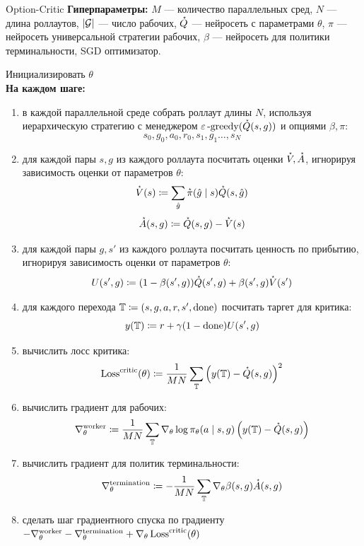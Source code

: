 \begin{algorithm}{Option-Critic}
\textbf{Гиперпараметры:} $M$ --- количество параллельных сред, $N$ --- длина роллаутов, $|\mathcal{G}|$ --- число рабочих, $\accentset{\star}{Q}$ --- нейросеть с параметрами $\theta$, $\pi$ --- нейросеть универсальной стратегии рабочих, $\beta$ --- нейросеть для политики терминальности, SGD оптимизатор.

\vspace{0.3cm}
Инициализировать $\theta$ \\
\textbf{На каждом шаге:}
\begin{enumerate}
    \item в каждой параллельной среде собрать роллаут длины $N$, используя иерархическую стратегию с менеджером $\varepsilon\operatorname{-greedy}(\accentset{\star}{Q}(s, g))$ и опциями $\beta, \pi$:
    $$s_0, g_0, a_0, r_0, s_1, g_1 \dots , s_N$$
    \item для каждой пары $s, g$ из каждого роллаута посчитать оценки $\accentset{\star}{V}, \accentset{\star}{A}$, игнорируя зависимость оценки от параметров $\theta$:
    $$\accentset{\star}{V}(s) \coloneqq \sum_{\hat{g}} \accentset{\star}{\pi}(\hat{g} \mid s) \accentset{\star}{Q}(s, \hat{g})$$
    $$\accentset{\star}{A}(s, g) \coloneqq \accentset{\star}{Q}(s, g) - \accentset{\star}{V}(s)$$
    \item для каждой пары $g, s'$ из каждого роллаута посчитать ценность по прибытию, игнорируя зависимость оценки от параметров $\theta$:
    $$U(s', g) \coloneqq (1 - \beta(s', g)) \accentset{\star}{Q}(s', g) + \beta(s', g) \accentset{\star}{V}(s')$$
    \item для каждого перехода $\mathbb{T} \coloneqq (s, g, a, r, s', \mathrm{done})$ посчитать таргет для критика:
    $$y(\mathbb{T}) \coloneqq r + \gamma (1 - \mathrm{done}) U(s', g)$$
    \item вычислить лосс критика:
    $$\operatorname{Loss}^{\mathrm{critic}}(\theta) \coloneqq \frac{1}{MN}\sum_{\mathbb{T}} \left( y(\mathbb{T}) - \accentset{\star}{Q}(s, g) \right) ^2$$
    \item вычислить градиент для рабочих:
    $$\nabla^{\mathrm{worker}}_\theta \coloneqq \frac{1}{MN}\sum_{\mathbb{T}} \nabla_\theta \log \pi_\theta(a \mid s, g) \left( y(\mathbb{T}) - \accentset{\star}{Q}(s, g) \right) $$
    \item вычислить градиент для политик терминальности:
    $$\nabla^{\mathrm{termination}}_\theta \coloneqq -\frac{1}{MN}\sum_{\mathbb{T}} \nabla_\theta \beta(s, g) \accentset{\star}{A}(s, g) $$
    \item сделать шаг градиентного спуска по градиенту $-\nabla^{\mathrm{worker}}_\theta - \nabla^{\mathrm{termination}}_\theta + \nabla_\theta \operatorname{Loss}^{\mathrm{critic}}(\theta)$
\end{enumerate}
\end{algorithm}

